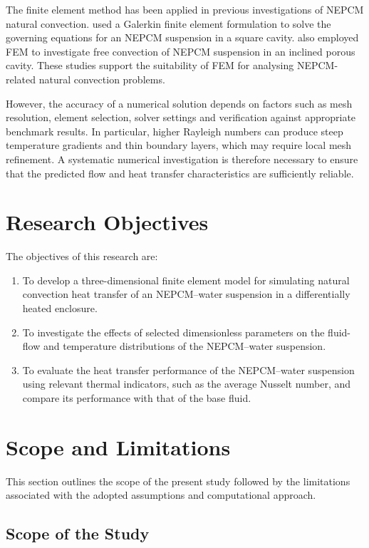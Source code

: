 The finite element method has been applied in previous investigations of NEPCM natural convection. \citet{ghalambaz2019} used a Galerkin finite element formulation to solve the governing equations for an NEPCM suspension in a square cavity. \citet{ghalambaz2020} also employed FEM to investigate free convection of NEPCM suspension in an inclined porous cavity. These studies support the suitability of FEM for analysing NEPCM-related natural convection problems.

However, the accuracy of a numerical solution depends on factors such as mesh resolution, element selection, solver settings and verification against appropriate benchmark results. In particular, higher Rayleigh numbers can produce steep temperature gradients and thin boundary layers, which may require local mesh refinement. A systematic numerical investigation is therefore necessary to ensure that the predicted flow and heat transfer characteristics are sufficiently reliable.

\section{Research Objectives}

The objectives of this research are:

\begin{enumerate}
    \item To develop a three-dimensional finite element model for simulating natural convection heat transfer of an NEPCM--water suspension in a differentially heated enclosure.
    \item To investigate the effects of selected dimensionless parameters on the fluid-flow and temperature distributions of the NEPCM--water suspension.
    \item To evaluate the heat transfer performance of the NEPCM--water suspension using relevant thermal indicators, such as the average Nusselt number, and compare its performance with that of the base fluid.
\end{enumerate}

\section{Scope and Limitations}

This section outlines the scope of the present study followed by the limitations associated with the adopted assumptions and computational approach.

\subsection{Scope of the Study}

